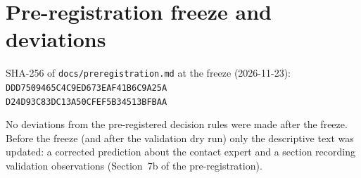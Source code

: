 \documentclass[11pt,a4paper]{article}
\begin{document}
\section{Pre-registration freeze and deviations}
SHA-256 of \texttt{docs/preregistration.md} at the freeze (2026-11-23): \\\texttt{\small DDD7509465C4C9ED673EAF41B6C9A25A}\\\texttt{\small D24D93C83DC13A50CFEF5B34513BFBAA}\par\medskip
No deviations from the pre-registered decision rules were made after the freeze. Before the freeze (and after the validation dry run) only the descriptive text was updated: a corrected prediction about the contact expert and a section recording validation observations (Section~7b of the pre-registration).
\end{document}

